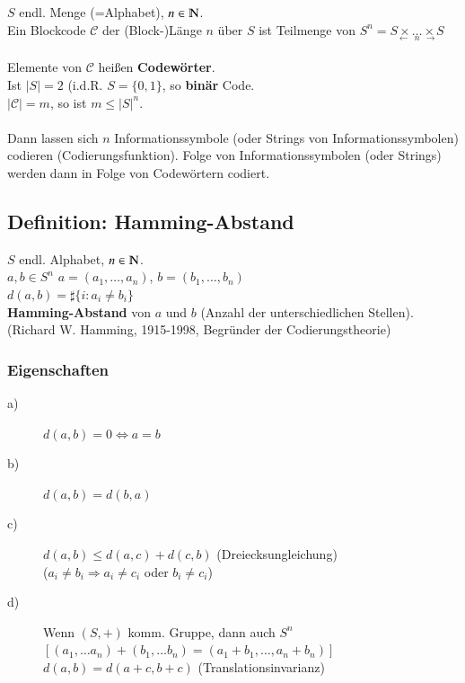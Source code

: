 $S$ endl. Menge (=Alphabet), $n \in \N$. \\
Ein Blockcode $\mathcal{C}$
der (Block-)L\"ange $n$ \"uber $S$ ist Teilmenge von $S^n=\underset{\longleftarrow \ \  n\ \  \longrightarrow}{S \times \ldots \times S}$ \\ %
\\
Elemente von $\mathcal{C}$ hei\ss en \textbf{Codew\"orter}. \\
Ist $\left| S \right| = 2$ (i.d.R. $S=\lbrace 0,1 \rbrace$, so \textbf{bin\"ar} Code.\\
$\left| \mathcal{C} \right| = m$, so ist $m \leq \left| S \right| ^ n$. \\
\\
Dann lassen sich $n$ Informationssymbole (oder Strings von Informationssymbolen) codieren (Codierungsfunktion). Folge von Informationssymbolen (oder Strings) werden dann in Folge von Codew\"ortern codiert.

\subsection{Definition: Hamming-Abstand}
$S$ endl. Alphabet, $n \in \N$. \\
$a,b \in S^n$ $a=(a_1, \ldots, a_n)$, $b=(b_1, \ldots, b_n)$ \\
$d(a, b)= \sharp \lbrace i : a_i \neq b_i \rbrace$ \\
\textbf{Hamming-Abstand} von $a$ und $b$ (Anzahl der unterschiedlichen Stellen). \\
(Richard W. Hamming, 1915-1998, Begr\"under der Codierungstheorie)

\subsubsection{Eigenschaften}
\begin{description}
	\item[a)] $d(a,b)=0 \Leftrightarrow a=b$
	\item[b)] $d(a,b)=d(b,a)$
	\item[c)] $d(a,b) \leq d(a,c) + d(c,b)$ (Dreiecksungleichung) \\
			($a_i \neq b_i \Rightarrow a_i \neq c_i$ oder $b_i \neq c_i$) 
	\item[d)] 	Wenn $(S,+)$ komm. Gruppe, dann auch $S^n$\\
				$[ (a_1,\ldots a_n) + (b_1, \ldots b_n) = (a_1+b_1,\ldots, a_n+b_n)]$\\
				$d(a,b)=d(a+c,b+c)$ (Translationsinvarianz)				
\end{description}

